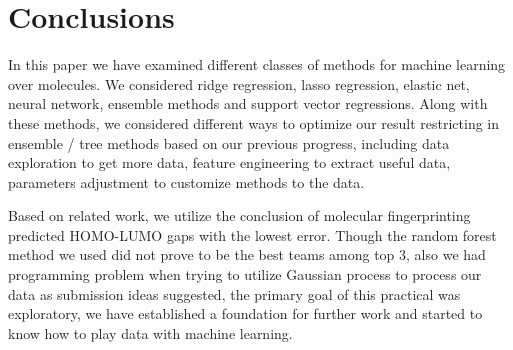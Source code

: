 \chapter{Conclusions}

In this paper we have examined different classes of methods for machine learning over molecules. We considered ridge regression, lasso regression, elastic net, neural network, ensemble methods and support vector regressions. Along with these methods, we considered different ways to optimize our result restricting in ensemble / tree methods based on our previous progress, including data exploration to get more data, feature engineering to extract useful data, parameters adjustment to customize methods to the data.

Based on related work, we utilize the conclusion of molecular fingerprinting predicted HOMO-LUMO gaps with the lowest error. Though the random forest method we used did not prove to be the best teams among top 3, also we had programming problem when trying to utilize Gaussian process to process our data as submission ideas \cite{WinNT} suggested, the primary goal of this practical was exploratory, we have established a foundation for further work and started to know how to play data with machine learning.